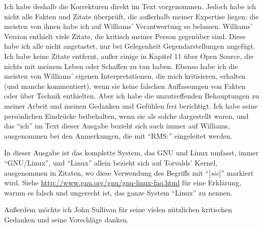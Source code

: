 Ich habe deshalb die Korrekturen direkt im Text vorgenommen. Jedoch habe ich nicht alle Fakten und Zitate überprüft, die außerhalb meiner Expertise liegen; die meisten von ihnen habe ich auf Williams' Verantwortung so belassen. Williams’ Version enthielt viele Zitate, die kritisch meiner Person gegenüber sind. Diese habe ich alle nicht angetastet, nur bei Gelegenheit Gegendarstellungen angefügt. Ich habe keine Zitate entfernt, außer einige in Kapitel 11 über Open Source, die nichts mit meinem Leben oder Schaffen zu tun haben. Ebenso habe ich die meisten von Williams’ eigenen Interpretationen, die mich kritisieren, erhalten (und manche kommentiert), wenn sie keine falschen Auffassungen von Fakten oder über Technik enthielten. Aber ich habe die unzutreffenden Behauptungen zu meiner Arbeit und meinen Gedanken und Gefühlen frei berichtigt. Ich habe seine persönlichen Eindrücke beibehalten, wenn sie als solche dargestellt waren, und das "`ich"' im Text dieser Ausgabe bezieht sich auch immer auf Williams, ausgenommen bei den Anmerkungen, die mit "`RMS:"' eingeleitet werden.

In dieser Ausgabe ist das komplette System, das GNU und Linux umfasst, immer "`GNU/Linux"', und "`Linux"' allein bezieht sich auf Torvalds’ Kernel, ausgenommen in Zitaten, wo diese Verwendung des Begriffs mit "`[\textit{sic}]"' markiert wird. Siehe \url{http://www.gnu.org/gnu/gnu-linux-faq.html} für eine Erklärung, warum es falsch und ungerecht ist, das ganze System "`Linux"' zu nennen. 

Außerdem möchte ich John Sullivan für seine vielen nützlichen kritischen Gedanken und seine Vorschläge danken.

